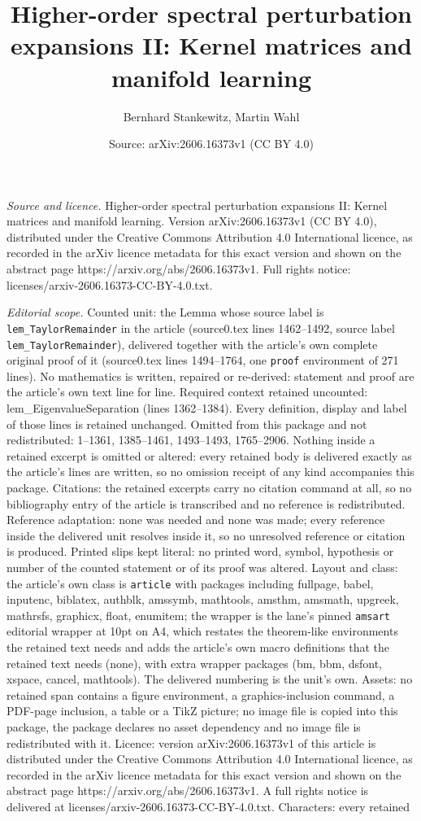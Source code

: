 \documentclass[10pt,a4paper]{amsart}
\title[Higher-order spectral perturbation expansions II: Kernel mat]{Higher-order spectral perturbation expansions II: Kernel matrices and manifold learning}
\author{Bernhard Stankewitz, Martin Wahl}
\date{Source: arXiv:2606.16373v1 (CC BY 4.0)}
\begin{document}
\maketitle

\noindent\emph{Source and licence.} Higher-order spectral perturbation expansions II: Kernel matrices and manifold learning. Version arXiv:2606.16373v1 (CC BY 4.0), distributed under the Creative Commons Attribution 4.0 International licence, as recorded in the arXiv licence metadata for this exact version and shown on the abstract page https://arxiv.org/abs/2606.16373v1. Full rights notice: licenses/arxiv-2606.16373-CC-BY-4.0.txt.\par\smallskip

\noindent\textit{Editorial scope.} Counted unit: the Lemma whose source label is \texttt{lem\_TaylorRemainder} in the article (source0.tex lines 1462--1492, source label \texttt{lem\_TaylorRemainder}), delivered together with the article's own complete original proof of it (source0.tex lines 1494--1764, one \texttt{proof} environment of 271 lines). No mathematics is written, repaired or re-derived: statement and proof are the article's own text line for line. Required context retained uncounted: lem\_EigenvalueSeparation (lines 1362--1384). Every definition, display and label of those lines is retained unchanged. Omitted from this package and not redistributed: 1--1361, 1385--1461, 1493--1493, 1765--2906. Nothing inside a retained excerpt is omitted or altered: every retained body is delivered exactly as the article's lines are written, so no omission receipt of any kind accompanies this package. Citations: the retained excerpts carry no citation command at all, so no bibliography entry of the article is transcribed and no reference is redistributed. Reference adaptation: none was needed and none was made; every reference inside the delivered unit resolves inside it, so no unresolved reference or citation is produced. Printed slips kept literal: no printed word, symbol, hypothesis or number of the counted statement or of its proof was altered. Layout and class: the article's own class is \texttt{article} with packages including fullpage, babel, inputenc, biblatex, authblk, amssymb, mathtools, amsthm, amsmath, upgreek, mathrsfs, graphicx, float, enumitem; the wrapper is the lane's pinned \texttt{amsart} editorial wrapper at 10pt on A4, which restates the theorem-like environments the retained text needs and adds the article's own macro definitions that the retained text needs (none), with extra wrapper packages (bm, bbm, dsfont, xspace, cancel, mathtools). The delivered numbering is the unit's own. Assets: no retained span contains a figure environment, a graphics-inclusion command, a PDF-page inclusion, a table or a TikZ picture; no image file is copied into this package, the package declares no asset dependency and no image file is redistributed with it. Licence: version arXiv:2606.16373v1 of this article is distributed under the Creative Commons Attribution 4.0 International licence, as recorded in the arXiv licence metadata for this exact version and shown on the abstract page https://arxiv.org/abs/2606.16373v1. A full rights notice is delivered at licenses/arxiv-2606.16373-CC-BY-4.0.txt. Characters: every retained 
\end{document}
